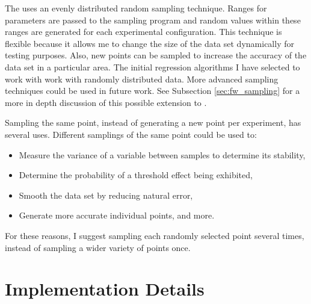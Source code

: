 The \fw uses an evenly distributed random sampling technique.
Ranges for parameters are passed to the sampling program and random values within these ranges are generated for each experimental configuration.
This technique is flexible because it allows me to change the size of the data set dynamically for testing purposes.
Also, new points can be sampled to increase the accuracy of the data set in a particular area.
The initial regression algorithms I have selected to work with \fw  work with randomly distributed data.
More advanced sampling techniques could be used in future work.
See Subsection \ref{sec:fw_sampling} for a more in depth discussion of this possible extension to \fw.

Sampling the same point, instead of generating a new point per experiment, has several uses.
Different samplings of the same point could be used to:
\begin{itemize}
   \item Measure the variance of a variable between samples to determine its stability,
   \item Determine the probability of a threshold effect being exhibited,
   \item Smooth the data set by reducing natural error,
   \item Generate more accurate individual points, and more.
\end{itemize}
For these reasons, I suggest sampling each randomly selected point several times, instead of sampling a wider variety of points once.

\section{Implementation Details}

